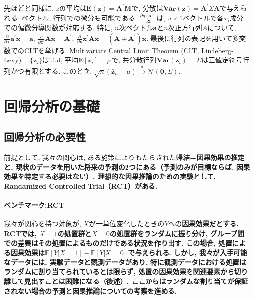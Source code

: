\documentclass[paper=a4paper,fontsize=10pt]{jlreq}
\begin{document}
先ほどと同様に, $z$の平均は$\mathbf{E(z)}=\mathbf{A^\prime M}$で, 分散は$\mathbf{Var(z)}=\mathbf{A^\prime} \Sigma \mathbf{A}$で与えられる. ベクトル, 行列での微分も可能である. $\frac{\partial g(\mathbf{x})}{\partial \mathbf{x}}$は, $n\times 1$ベクトルで各$x_i$成分での偏微分導関数が対応する. 特に, $n$次ベクトル$\mathbf{a}$と$n$次正方行列$A$について, $\frac{\partial}{\partial \mathbf{x}}\mathbf{a^\prime x}=\mathbf{a}$, $\frac{\partial}{\partial \mathbf{x^\prime}}\mathbf{A x}=\mathbf{A^\prime}$, $\frac{\partial}{\partial \mathbf{x}}\mathbf{x^\prime A x}=\mathbf{(A+A^\prime)x}$. 最後に行列の表記を用いて多変数でのCLTを挙げる. Multivariate Central Limit Theorem (CLT, Lindeberg-Levy):　$\{\mathbf{z}_i\}$はi.i.d, 平均$\mathbf{E}[\mathbf{z}_i]=\mu$で, 共分散行列$\mathbf{Var}(\mathbf{z}_i)=\Sigma$は正値定符号行列かつ有限とする. このとき, $\sqrt{n}(\bar{\mathbf{z}}_n-\mu) \overset{d}{\to}\mathcal{N}(\mathbf{0},\Sigma)$.\\

\section{回帰分析の基礎}
\subsection{回帰分析の必要性}
前提として, 我々の関心は, ある施策によりもたらされた帰結＝\rmfamily\mcfamily\bfseries{因果効果の推定}\mdseries と, 現状のデータを用いた\rmfamily\mcfamily\bfseries{将来の予測}\mdseries の2つにある（予測のみが目標ならば, 因果効果を特定する必要はない）. 理想的な因果推論のための実験として, \rmfamily\mcfamily\bfseries{Randamized Controlled Trial（RCT）}\mdseries がある.\\

\paragraph{ベンチマーク:RCT}
我々が関心を持つ対象が, $X$が一単位変化したときの$Y$への\rmfamily\mcfamily\bfseries{因果効果}\mdseries だとする. RCTでは, $X=1$の処置群と$X=0$の処置群を\rmfamily\mcfamily\bfseries{ランダム}\mdseries に振り分け, グループ間での差異はその処置によるものだけである状況を作り出す. この場合, 処置による\rmfamily\mcfamily\bfseries{因果効果}\mdseries は$\mathbb{E}[Y|X=1]-\mathbb{E}[Y|X=0]$で与えられる. しかし, 我々が入手可能なデータには, 実験データと観測データがあり, 特に観測データにおける処置はランダムに割り当てられているとは限らず, 処置の因果効果を関連要素から切り離して見出すことは困難になる（後述）. ここからはランダムな割り当てが保証されない場合の予測と因果推論についての考察を進める. \\
\end{document}
